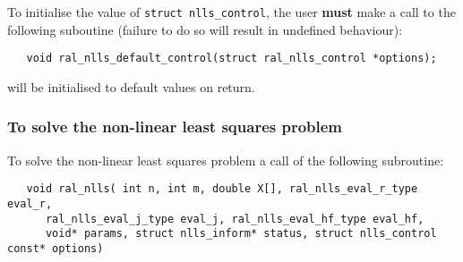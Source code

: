 \documentclass{spec}
\begin{document}
To initialise the value of \texttt{struct nlls\_control}, the user \textbf{must} make a
call to the following suboutine (failure to do so will result in undefined behaviour):
\begin{verbatim}
   void ral_nlls_default_control(struct ral_nlls_control *options);
\end{verbatim}

\begin{description}
    will be initialised to default values on return.
\end{description}

\subsubsection{To solve the non-linear least squares problem}
\label{sec:solve}

To solve the non-linear least squares problem a call of the following 
subroutine:

\begin{verbatim}
   void ral_nlls( int n, int m, double X[], ral_nlls_eval_r_type eval_r,
      ral_nlls_eval_j_type eval_j, ral_nlls_eval_hf_type eval_hf,
      void* params, struct nlls_inform* status, struct nlls_control const* options)
\end{verbatim}
\end{document}
